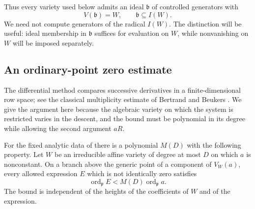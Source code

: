 Thus every variety used below admits an ideal $\mathfrak b$ of controlled
generators with
\begin{equation}\label{eq:controlled-support}
 V(\mathfrak b)=W,\qquad \mathfrak b\subseteq I(W).
\end{equation}
We need not compute generators of the radical $I(W)$.  The distinction
will be useful: ideal membership in $\mathfrak b$ suffices for evaluation
on $W$, while nonvanishing on $W$ will be imposed separately.

\subsection{An ordinary-point zero estimate}

The differential method compares successive derivatives in a
finite-dimensional row space; see the classical multiplicity estimate
of Bertrand and Beukers \cite[Theorem~1]{BertrandBeukers1985}.
We give the argument here because the algebraic variety on which the
system is restricted varies in the descent, and the bound must be
polynomial in its degree while allowing the second argument $aR$.

\begin{lemma}\label{lem:zero-estimate}
For the fixed analytic data of  there is a
polynomial $M(D)$ with the following property.  Let $W$ be an irreducible
affine variety of degree at most $D$ on which $a$ is nonconstant.  On a
branch above the generic point of a component of $V_W(a)$, every allowed
expression $E$ which is not identically zero satisfies
\begin{equation}\label{eq:divisorial-zero-estimate}
 \operatorname{ord}_{\mathfrak p}E
 <M(D)\operatorname{ord}_{\mathfrak p}a.
\end{equation}
The bound is independent of the heights of the coefficients of $W$ and
of the expression.
\end{lemma}

